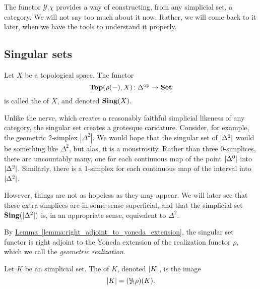 \documentclass[main.tex]{subfiles}
\begin{document}
The functor $\mathcal{Y}_{!}\chi$ provides a way of constructing, from any simplicial set, a category. We will not say too much about it now. Rather, we will come back to it later, when we have the tools to understand it properly.

\subsection{Singular sets}
\label{ssc:singular_sets}

\begin{definition}
  \label{def:singular_set_of_a_topological_space}
  Let $X$ be a topological space. The functor
  \begin{equation*}
    \mathbf{Top}(\rho(-), X)\colon \Delta^{\mathrm{op}} \to \mathbf{Set}
  \end{equation*}
  is called the  of $X$, and denoted $\mathbf{Sing}(X)$.
\end{definition}

Unlike the nerve, which creates a reasonably faithful simplicial likeness of any category, the singular set creates a grotesque caricature. Consider, for example, the geometric 2-simplex $|\Delta^{2}|$. We would hope that the singular set of ${| \Delta^{2} |}$ would be something like $\Delta^{2}$, but alas, it is a monstrosity. Rather than three 0-simplices, there are uncountably many, one for each continuous map of the point ${| \Delta^{0} |}$ into ${| \Delta^{2} |}$. Similarly, there is a 1-simplex for each continuous map of the interval into ${| \Delta^{2} |}$.

However, things are not as hopeless as they may appear. We will later see that these extra simplices are in some sense superficial, and that the simplicial set $\mathbf{Sing}({| \Delta^{2} |})$ is, in an appropriate sense, equivalent to $\Delta^{2}$.

By \hyperref[lemma:right_adjoint_to_yoneda_extension]{Lemma~\ref*{lemma:right_adjoint_to_yoneda_extension}}, the singular set functor is right adjoint to the Yoneda extension of the realization functor $\rho$, which we call the \emph{geometric realization.}

\begin{definition}
  \label{def:geometric_realization}
  Let $K$ be an simplicial set. The  of $K$, denoted ${| K |}$, is the image
  \begin{equation*}
    {| K |} = (\mathcal{Y}_{!}\rho)(K).
  \end{equation*}
\end{definition}
\end{document}
